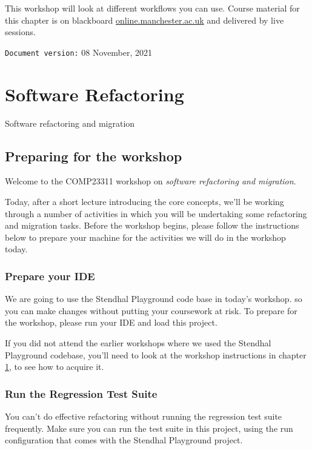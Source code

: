 \documentclass[
]{book}
\begin{document}
This workshop will look at different workflows you can use. Course material for this chapter is on blackboard \href{https://online.manchester.ac.uk}{online.manchester.ac.uk} and delivered by live sessions.

\texttt{Document\ version:} 08 November, 2021

\hypertarget{refactoring}{%
\chapter{Software Refactoring}\label{refactoring}}

Software refactoring and migration

\hypertarget{gitprep}{%
\section{Preparing for the workshop}\label{gitprep}}

Welcome to the COMP23311 workshop on \emph{software refactoring and migration}.

Today, after a short lecture introducing the core concepts, we'll be working through a number of activities in which you will be undertaking some refactoring and migration tasks. Before the workshop begins, please follow the instructions below to prepare your machine for the activities we will do in the workshop today.

\hypertarget{prepide}{%
\subsection{Prepare your IDE}\label{prepide}}

We are going to use the Stendhal Playground code base in today's workshop. so you can make changes without putting your coursework at risk. To prepare for the workshop, please run your IDE and load this project.

If you did not attend the earlier workshops where we used the Stendhal Playground codebase, you'll need to look at the workshop instructions in chapter \ref{refactoring}, to see how to acquire it.

\hypertarget{testsuite}{%
\subsection{Run the Regression Test Suite}\label{testsuite}}

You can't do effective refactoring without running the regression test suite frequently. Make sure you can run the test suite in this project, using the run configuration that comes with the Stendhal Playground project.
\end{document}
